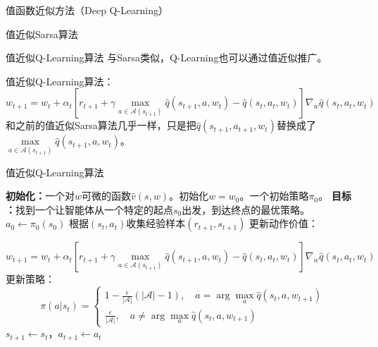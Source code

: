 \begin{section}{值函数近似方法\alert{（Deep Q-Learning）}}
\begin{frame}{值近似Sarsa算法}
\begin{center}
\begin{minipage}{0.3\textwidth}
        \end{minipage}
    \end{center}
    
\end{frame}

\begin{frame}{值近似Q-Learning算法}
    与Sarsa类似，Q-Learning也可以通过值近似推广。

    值近似Q-Learning算法：
    \alert{\[
        w_{t+1}=w_t+\alpha_t[r_{t+1}+\gamma \underset{a\in \mathcal{A}(s_{t+1})}{\max}\hat{q}(s_{t+1},a,w_t)-\hat{q}(s_t,a_t,w_t)]\nabla_w\hat{q}(s_t,a_t,w_t)
    \]}
    和之前的值近似Sarsa算法几乎一样，只是把$\hat{q}(s_{t+1},a_{t+1},w_t)$替换成了$\underset{a\in \mathcal{A}(s_{t+1})}{\max}\hat{q}(s_{t+1},a,w_t)$。
\end{frame}

\begin{frame}{值近似Q-Learning算法}
    \begin{algorithmic}[1]
        \State \textbf{初始化：}一个对$w$可微的函数$\hat{v}(s,w)$。初始化$w=w_0$。一个初始策略$\pi_0$。
        \State \textbf{目标 ：}找到一个让智能体从一个特定的起点$s_0$出发，到达终点的最优策略。
            \State $a_0\leftarrow\pi_0(s_0)$
                \State 根据$(s_t,a_t)$收集经验样本$(r_{t+1}, s_{t+1})$
                \State 更新动作价值：

                $w_{t+1}=w_t+\alpha_t[r_{t+1}+\gamma \underset{a\in \mathcal{A}(s_{t+1})}{\max}\hat{q}(s_{t+1},a,w_t)-\hat{q}(s_t,a_t,w_t)]\nabla_w\hat{q}(s_t,a_t,w_t)$
                \State 更新策略：
                \[
                    \pi(a|s_t)=\begin{cases}
                        1-\frac{\epsilon}{|\mathcal{A}|}(|\mathcal{A}|-1),\quad a=\arg\max_{a}\hat{q}(s_t,a,w_{t+1}) \\
                        \frac{\epsilon}{|\mathcal{A}|},\quad a \neq \arg\max_{a}\hat{q}(s_t,a,w_{t+1})
                    \end{cases}
                \]
                \State $s_{t+1}\leftarrow s_t$，$a_{t+1}\leftarrow a_t$
            \EndWhile
        \EndFor
    \end{algorithmic}
\end{frame}


\end{section}
